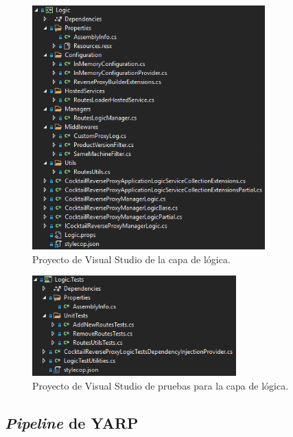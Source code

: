 \documentclass[11pt,spanish,listoffigures]{tfgetsinf}
\begin{document}
\begin{figure}[H]
\centering
\includegraphics[width=0.8\textwidth]{imagenes/proyectoLogica}
\caption{Proyecto de Visual Studio de la capa de lógica.}
	\label{proyectoLogica}
\end{figure}

\begin{figure}[H]
\centering
\includegraphics[width=0.7\textwidth]{imagenes/proyectoTestsLogica}
\caption{Proyecto de Visual Studio de pruebas para la capa de lógica.}
	\label{proyectoTestsLogica}
\end{figure}

\newpage %


		\subsection{\emph{Pipeline} de YARP} \label{pipelineYARP}
\end{document}

